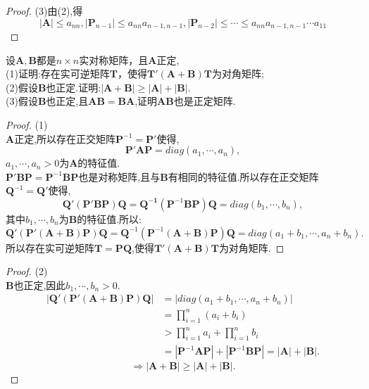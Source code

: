 \documentclass[lang=cn,11pt,normal]{elegantbook}
\renewcommand{\AA}{\boldsymbol{A}}
\newcommand{\BB}{\boldsymbol{B}}
\newcommand{\TT}{\boldsymbol{T}}
\newcommand{\PP}{\boldsymbol{P}}
\newcommand{\QQ}{\boldsymbol{Q}}
\begin{document}
	\begin{proof}
		(3)由(2),得
		\begin{equation}
		|\AA|\leq a_{nn},|\PP_{n-1}|\leq a_{nn}a_{n-1,n-1},|\PP_{n-2}|\leq \cdots\leq a_{nn}a_{n-1,n-1}\cdots a_{11}
		\end{equation}
	\end{proof}
	\begin{exercise}
		设$\AA,\BB$都是$n\times n$实对称矩阵，且$\AA$正定,\\
		(1)证明:存在实可逆矩阵$\TT$，使得$\TT'(\AA+\BB)\TT$为对角矩阵;\\
		(2)假设$\BB$也正定.证明:$|\AA+\BB|\geq|\AA|+|\BB|.$\\
		(3)假设$\BB$也正定,且$\AA\BB=\BB\AA$,证明$\AA\BB$也是正定矩阵.
	\end{exercise}
	\begin{proof}
		(1)\\
		$\AA$正定,所以存在正交矩阵$\PP^{-1}=\boldsymbol{P'}$使得,
		\begin{equation}
		\PP'\boldsymbol{AP}=diag\left(a_1,\cdots,a_n\right),
		\end{equation}
		$a_1,\cdots,a_n>0$为$\AA$的特征值.\\
		$\PP'\boldsymbol{BP}=\PP^{-1}\boldsymbol{BP}$也是对称矩阵,且与$\BB$有相同的特征值.所以存在正交矩阵$\QQ^{-1}=\QQ'$使得,
		\begin{equation}
		\QQ'(\PP'\boldsymbol{BP})\QQ=\boldsymbol{Q^{-1}}(\PP^{-1}\boldsymbol{BP})\QQ=diag\left(b_1,\cdots,b_n\right),
		\end{equation}
		其中$b_1,\cdots,b_n$为$\BB$的特征值.所以:
		\begin{equation}
		\QQ'(\PP'(\AA+\BB)\PP)\QQ=\QQ^{-1}(\PP^{-1}(\AA+\BB)\PP)\QQ=diag\left(a_1+b_1,\cdots,a_n+b_n\right).
		\end{equation}
		所以存在实可逆矩阵$\TT=\boldsymbol{PQ}$,使得$\TT'(\AA+\BB)\TT$为对角矩阵.
	\end{proof}
	\begin{proof}
		(2)\\
		$\BB$也正定,因此$b_1,\cdots,b_n>0$.
		\begin{align*}
			|\QQ'(\PP'(\AA+\BB)\PP)\QQ|
			&=|diag(a_1+b_1,\cdots,a_n+b_n)|\\
			&=\prod_{i=1}^{n}(a_i+b_i)\\
			&>\prod_{i=1}^{n}a_i+\prod_{i=1}^{n}b_i\\
			&=|\PP^{-1}\boldsymbol{AP}|+|\PP^{-1}\boldsymbol{BP}|=|\AA|+|\BB|.
			\end{align*}
			\begin{equation}
			\Rightarrow|\AA+\BB|\ge|\AA|+|\BB|.
			\end{equation}
	\end{proof}
\end{document}
